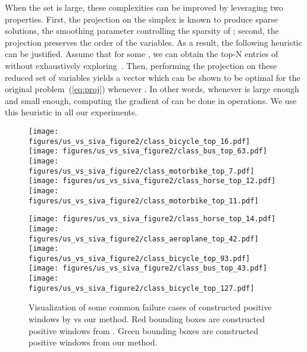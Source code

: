 \documentclass{article}
\begin{document}
When the set  is large, these complexities can be improved by leveraging
two properties. First, the projection on the simplex is known to produce sparse
solutions, the smoothing parameter  controlling the sparsity of
; second, the projection preserves the order of the variables. As a
result, the following heuristic can be justified. Assume that for some , we can obtain the top-N entries of  without exhaustively
exploring~. Then, performing the projection on these reduced set of 
variables yields a vector  which can be shown to be optimal for the
original problem~(\ref{eq:proj}) whenever .  In other words,
whenever  is large enough and  small enough, computing the gradient of
 can be done in  operations.  We use this heuristic in
all our experiments.














\begin{figure*}[htbp]
\centering
\texttt{[image: figures/us\_vs\_siva\_figure2/class\_bicycle\_top\_16.pdf]} \hspace{0.04cm}
\texttt{[image: figures/us\_vs\_siva\_figure2/class\_bus\_top\_63.pdf]}  \hspace{0.04cm} 
\texttt{[image: figures/us\_vs\_siva\_figure2/class\_motorbike\_top\_7.pdf]}  \hspace{0.04cm}
\texttt{[image: figures/us\_vs\_siva\_figure2/class\_horse\_top\_12.pdf]}  \hspace{0.04cm}
\texttt{[image: figures/us\_vs\_siva\_figure2/class\_motorbike\_top\_11.pdf]} 

\texttt{[image: figures/us\_vs\_siva\_figure2/class\_horse\_top\_14.pdf]} \hspace{0.04cm}
\texttt{[image: figures/us\_vs\_siva\_figure2/class\_aeroplane\_top\_42.pdf]} \hspace{0.04cm}
\texttt{[image: figures/us\_vs\_siva\_figure2/class\_bicycle\_top\_93.pdf]} \hspace{0.04cm}
\texttt{[image: figures/us\_vs\_siva\_figure2/class\_bus\_top\_43.pdf]} \hspace{0.04cm}
\texttt{[image: figures/us\_vs\_siva\_figure2/class\_bicycle\_top\_127.pdf]}
\caption{Visualization of some common failure cases of constructed positive windows by\cite{siva2012defence} vs our method. Red bounding boxes are constructed positive windows from \cite{siva2012defence}. Green bounding boxes are constructed positive windows from our method.} 
\label{fig:us_vs_siva} 
\end{figure*}
\end{document}
